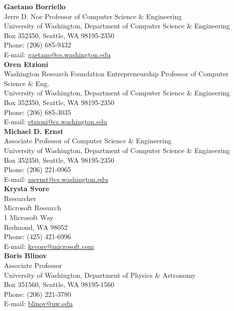 \documentclass[letter]{article}
\begin{document}
{\bf Gaetano Borriello}\\
Jerre D. Noe Professor of Computer Science \& Engineering\\
University of Washington, Department of Computer Science \& Engineering\\
Box 352350, Seattle, WA 98195-2350\\
Phone: (206) 685-9432\\
E-mail: \url{gaetano@cs.washington.edu}\\

{\bf Oren Etzioni}\\
Washington Research Foundation Entrepreneurship Professor of Computer Science \& Eng.\\
University of Washington, Department of Computer Science \& Engineering\\
Box 352350, Seattle, WA 98195-2350\\
Phone: (206) 685-3035\\
E-mail: \url{etzioni@cs.washington.edu}\\

{\bf Michael D. Ernst}\\
Associate Professor of Computer Science \& Engineering\\
University of Washington, Department of Computer Science \& Engineering\\
Box 352350, Seattle, WA 98195-2350\\
Phone: (206) 221-0965\\
E-mail: \url{mernst@cs.washington.edu}\\

{\bf Krysta Svore}\\
Researcher\\
Microsoft Research\\
1 Microsoft Way\\
Redmond, WA 98052\\
Phone: (425) 421-6996\\
E-mail: \url{ksvore@microsoft.com}\\

{\bf Boris Blinov}\\
Associate Professor\\
University of Washington, Department of Physics \& Astronomy\\
Box 351560, Seattle, WA 98195-1560\\
Phone: (206) 221-3780\\
E-mail: \url{blinov@uw.edu}\\
\end{document}
